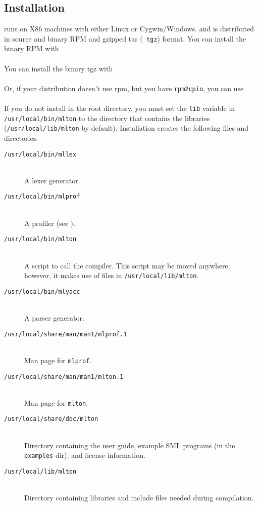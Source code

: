 
\subsection{Installation}

{\mlton} runs on X86 machines with either Linux or Cygwin/Windows.
and is distributed in source and binary RPM and gzipped tar ({\tt
tgz}) format.  You can install the binary RPM with\\
\hspace*{2em}{\tt rpm -i mlton-\version-1.i386.rpm}\\
You can install the binary tgz with\\
\hspace*{2em}{\tt zcat mlton-\version-1.i386.tgz | tar x}\\
Or, if your distribution doesn't use rpm, but you have {\tt rpm2cpio},
you can use\\
\hspace*{2em}{\tt rpm2cpio mlton-\version-1.i386.rpm | cpio -id}\\
If you do not install {\mlton} in the root directory, you must
set the {\tt lib} variable in {\tt /usr/local/bin/mlton} to the
directory that contains the libraries ({\tt /usr/local/lib/mlton} by
default).
Installation creates the following files and directories.

\newcommand{\place}[1]{\item[\tt #1]\hspace{1in}\\}

\begin{description}

\place{/usr/local/bin/mllex}
A lexer generator.

\place{/usr/local/bin/mlprof}
A profiler (see ).

\place{/usr/local/bin/mlton}
A script to call the compiler.
This script may be moved anywhere, however,
it makes use of files in {\tt /usr/local/lib/mlton}.

\place{/usr/local/bin/mlyacc}
A parser generator.

\place{/usr/local/share/man/man1/mlprof.1}
Man page for {\tt mlprof}.

\place{/usr/local/share/man/man1/mlton.1}
Man page for {\tt mlton}.

\place{/usr/local/share/doc/mlton}

Directory containing the user guide, example SML programs (in the {\tt examples}
dir), and license information.

\place{/usr/local/lib/mlton}
Directory containing libraries and include files needed during
compilation.

\end{description}

